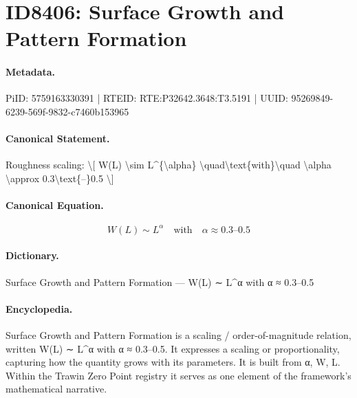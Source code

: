 \section*{ID8406: Surface Growth and Pattern Formation}
\paragraph{Metadata.}
PiID: 5759163330391 | RTEID: RTE:P32642.3648:T3.5191 | UUID: 95269849-6239-569f-9832-c7460b153965

\paragraph{Canonical Statement.}
Roughness scaling: \textbackslash{}[ W(L) \textbackslash{}sim L\textasciicircum{}\{\textbackslash{}alpha\} \textbackslash{}quad\textbackslash{}text\{with\}\textbackslash{}quad \textbackslash{}alpha \textbackslash{}approx 0.3\textbackslash{}text\{–\}0.5 \textbackslash{}]

\paragraph{Canonical Equation.}
\[
W(L) \sim L^{\alpha} \quad\text{with}\quad \alpha \approx 0.3\text{–}0.5
\]

\paragraph{Dictionary.}
Surface Growth and Pattern Formation — W(L) ∼ L\textasciicircum{}α with α ≈ 0.3–0.5

\paragraph{Encyclopedia.}
Surface Growth and Pattern Formation is a scaling / order-of-magnitude relation, written W(L) ∼ L\textasciicircum{}α with α ≈ 0.3–0.5. It expresses a scaling or proportionality, capturing how the quantity grows with its parameters. It is built from α, W, L. Within the Trawin Zero Point registry it serves as one element of the framework's mathematical narrative.
